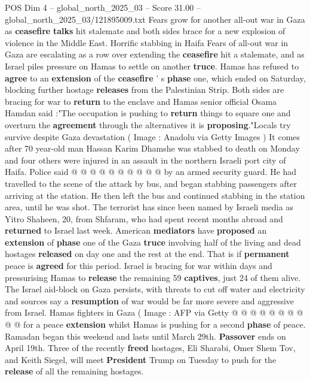 \begin{textsample}{POS Dim 4 – global\_north\_2025\_03 – Score 31.00 – global\_north\_2025\_03/121895009.txt}  \label{ex:f4_pos_066}
Fears grow for another all-out war in Gaza as \textbf{ceasefire} \textbf{talks} hit stalemate and both sides brace for a new explosion of violence in the Middle East.
Horrific stabbing in Haifa Fears of all-out war in Gaza are escalating as a row over extending the \textbf{ceasefire} hit a stalemate, and as Israel piles pressure on Hamas to settle on another \textbf{truce}.
Hamas has refused to \textbf{agree} to an \textbf{extension} of the \textbf{ceasefire} ' s \textbf{phase} one, which ended on Saturday, blocking further hostage \textbf{releases} from the Palestinian Strip.
Both sides are bracing for war to \textbf{return} to the enclave and Hamas senior official Osama Hamdan said :"The occupation is pushing to \textbf{return} things to square one and overturn the \textbf{agreement} through the alternatives it is \textbf{proposing}."Locals try survive despite Gaza devastation ( Image : Anadolu via Getty Images ) It comes after 70 year-old man Hassan Karim Dhamshe was stabbed to death on Monday and four others were injured in an assault in the northern Israeli port city of Haifa.
Police said @ @ @ @ @ @ @ @ @ @ by an armed security guard.
He had travelled to the scene of the attack by bus, and began stabbing passengers after arriving at the station.
He then left the bus and continued stabbing in the station area, until he was shot.
The terrorist has since been named by Israeli media as Yitro Shaheen, 20, from Shfaram, who had spent recent months abroad and \textbf{returned} to Israel last week.
American \textbf{mediators} have \textbf{proposed} an \textbf{extension} of \textbf{phase} one of the Gaza \textbf{truce} involving half of the living and dead hostages \textbf{released} on day one and the rest at the end.
That is if \textbf{permanent} peace is \textbf{agreed} for this period.
Israel is bracing for war within days and pressurising Hamas to \textbf{release} the remaining 59 \textbf{captives}, just 24 of them alive.
The Israel aid-block on Gaza persists, with threats to cut off water and electricity and sources say a \textbf{resumption} of war would be far more severe and aggressive from Israel.
Hamas fighters in Gaza ( Image : AFP via Getty @ @ @ @ @ @ @ @ @ @ for a peace \textbf{extension} whilst Hamas is pushing for a second \textbf{phase} of peace.
Ramadan began this weekend and lasts until March 29th. \textbf{Passover} ends on April 19th.
Three of the recently \textbf{freed} hostages, Eli Sharabi, Omer Shem Tov, and Keith Siegel, will meet \textbf{President} Trump on Tuesday to push for the \textbf{release} of all the remaining hostages.

\end{textsample}
